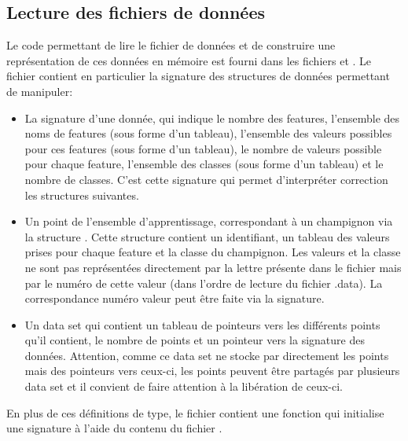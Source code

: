 \documentclass[a4paper, 10pt]{article}
\begin{document}
\subsection{Lecture des fichiers de données}
Le code permettant de lire le fichier de données et de construire une représentation de ces données en mémoire est fourni dans les fichiers  et . Le fichier  contient en particulier la signature des structures de données permettant de manipuler:
\begin{itemize}
\item La signature d'une donnée, qui indique le nombre des features, l'ensemble des noms de features (sous forme d'un tableau), l'ensemble des valeurs possibles pour ces features (sous forme d'un tableau), le nombre de valeurs possible pour chaque feature, l'ensemble des classes (sous forme d'un tableau) et le nombre de classes. C'est cette signature qui permet d'interpréter correction les structures suivantes.
\item Un point de l'ensemble d'apprentissage, correspondant à un champignon via la structure . Cette structure contient un identifiant, un tableau des valeurs prises pour chaque feature et la classe du champignon. Les valeurs et la classe ne sont pas représentées directement par la lettre présente dans le fichier  mais par le numéro de cette valeur (dans l'ordre de lecture du fichier \mlc.data). La correspondance numéro valeur peut être faite via la signature.
\item Un data set qui contient un tableau de pointeurs vers les différents points qu'il contient, le nombre de points et un pointeur vers la signature des données. Attention, comme ce data set ne stocke par directement les points mais des pointeurs vers ceux-ci, les points peuvent être partagés par plusieurs data set et il convient de faire attention à la libération de ceux-ci.
\end{itemize}
En plus de ces définitions de type, le fichier  contient une fonction  qui initialise une signature à l'aide du contenu du fichier .
\end{document}
